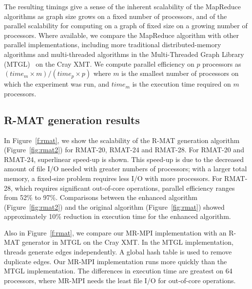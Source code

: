 The resulting timings give a sense of the inherent scalability of the
MapReduce algorithms as graph size grows on a fixed number of
processors, and of the parallel scalability for computing on a graph
of fixed size on a growing number of processors.  Where available, we
compare the MapReduce algorithm with other parallel implementations,
including more traditional distributed-memory algorithms and 
multi-threaded algorithms
in the Multi-Threaded Graph Library (MTGL)~\cite{MTGL} on the Cray XMT.
We compute parallel efficiency on $p$ processors
as $({time}_{m} \times m) / ({time}_p \times p)$
where $m$ is the smallest number of processors on which the experiment
was run, and ${time}_m$ is the execution time required on $m$ processors.

\subsection{R-MAT generation results}

In Figure~\ref{f:rmat}, we show the scalability of the R-MAT generation 
algorithm (Figure~\ref{fig:rmat2}) for RMAT-20, RMAT-24 and RMAT-28.  For
RMAT-20 and RMAT-24, superlinear speed-up is shown.  This speed-up is due
to the decreased amount of file I/O needed with greater numbers of 
processors; with a larger total memory, a fixed-size problem requires
less I/O with more processors.  For RMAT-28, which requires
significant out-of-core operations, parallel efficiency ranges from 52\% to
97\%.  Comparisons between the enhanced algorithm (Figure~\ref{fig:rmat2}) and
the original algorithm (Figure~\ref{fig:rmat}) showed approximately 
10\% reduction in execution time for the enhanced algorithm.

Also in Figure~\ref{f:rmat}, we compare our MR-MPI implementation with an 
R-MAT generator in MTGL on the Cray XMT.  In the MTGL implementation, 
threads generate edges independently.  A global hash table is used to remove
duplicate edges.  Our MR-MPI implementation runs more quickly than the MTGL
implementation.  The differences in execution time are greatest on 64
processors, where MR-MPI needs the least file I/O for out-of-core operations.

